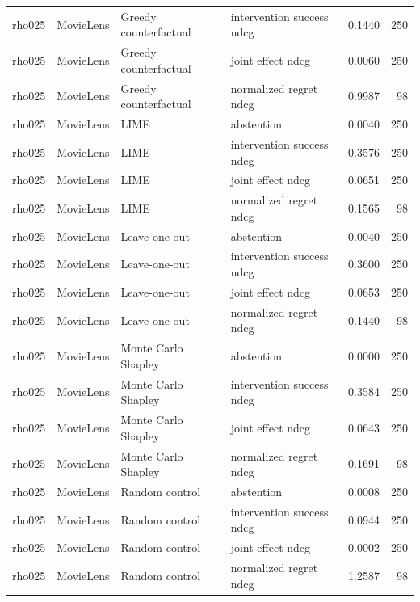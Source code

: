 \begin{longtable}{@{}p{}p{}p{}p{}rr@{}}
rho025 & MovieLens & Greedy counterfactual & intervention success ndcg & 0.1440 & 250 \\
rho025 & MovieLens & Greedy counterfactual & joint effect ndcg & 0.0060 & 250 \\
rho025 & MovieLens & Greedy counterfactual & normalized regret ndcg & 0.9987 & 98 \\
rho025 & MovieLens & LIME & abstention & 0.0040 & 250 \\
rho025 & MovieLens & LIME & intervention success ndcg & 0.3576 & 250 \\
rho025 & MovieLens & LIME & joint effect ndcg & 0.0651 & 250 \\
rho025 & MovieLens & LIME & normalized regret ndcg & 0.1565 & 98 \\
rho025 & MovieLens & Leave-one-out & abstention & 0.0040 & 250 \\
rho025 & MovieLens & Leave-one-out & intervention success ndcg & 0.3600 & 250 \\
rho025 & MovieLens & Leave-one-out & joint effect ndcg & 0.0653 & 250 \\
rho025 & MovieLens & Leave-one-out & normalized regret ndcg & 0.1440 & 98 \\
rho025 & MovieLens & Monte Carlo Shapley & abstention & 0.0000 & 250 \\
rho025 & MovieLens & Monte Carlo Shapley & intervention success ndcg & 0.3584 & 250 \\
rho025 & MovieLens & Monte Carlo Shapley & joint effect ndcg & 0.0643 & 250 \\
rho025 & MovieLens & Monte Carlo Shapley & normalized regret ndcg & 0.1691 & 98 \\
rho025 & MovieLens & Random control & abstention & 0.0008 & 250 \\
rho025 & MovieLens & Random control & intervention success ndcg & 0.0944 & 250 \\
rho025 & MovieLens & Random control & joint effect ndcg & 0.0002 & 250 \\
rho025 & MovieLens & Random control & normalized regret ndcg & 1.2587 & 98 \\
\end{longtable}
